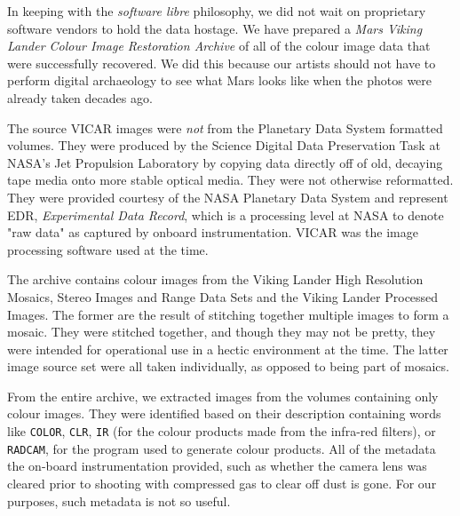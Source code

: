 In keeping with the {\it software libre} philosophy, we did not wait on proprietary software vendors to hold the data hostage. We have prepared a {\it Mars Viking Lander Colour Image Restoration Archive} of all of the colour image data that were successfully recovered. We did this because our artists should not have to perform digital archaeology to see what Mars looks like when the photos were already taken decades ago.

The source VICAR images were {\it not} from the Planetary Data System formatted volumes. They were produced by the Science Digital Data Preservation Task at NASA's Jet Propulsion Laboratory by copying data directly off of old, decaying tape media onto more stable optical media. They were not otherwise reformatted. They were provided courtesy of the NASA Planetary Data System and represent EDR, {\it Experimental Data Record}, which is a processing level at NASA to denote "raw data" as captured by onboard instrumentation. VICAR was the image processing software used at the time.

The archive contains colour images from the Viking Lander High Resolution Mosaics, Stereo Images and Range Data Sets and the Viking Lander Processed Images. The former are the result of stitching together multiple images to form a mosaic. They were stitched together, and though they may not be pretty, they were intended for operational use in a hectic environment at the time. The latter image source set were all taken individually, as opposed to being part of mosaics.

From the entire archive, we extracted images from the volumes containing only colour images. They were identified based on their description containing words like {\tt COLOR}, {\tt CLR}, {\tt IR} (for the colour products made from the infra-red filters), or {\tt RADCAM}, for the program used to generate colour products. All of the metadata the on-board instrumentation provided, such as whether the camera lens was cleared prior to shooting with compressed gas to clear off dust is gone. For our purposes, such metadata is not so useful.

\StopChapter

